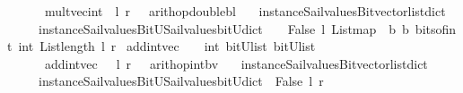 \begin{isabellebody}
\ \ \ \ \ {\isachardoublequoteopen}\ mult{\isacharunderscore}vec{\isacharunderscore}int\ \ l\ r\ {\isacharequal}\ {\isacharparenleft}\ arith{\isacharunderscore}op{\isacharunderscore}double{\isacharunderscore}bl\ \isanewline
\ \ {\isacharparenleft}instance{\isacharunderscore}Sail{}{\isacharunderscore}values{\isacharunderscore}Bitvector{\isacharunderscore}list{\isacharunderscore}dict\isanewline
\ \ \ \ \ instance{\isacharunderscore}Sail{}{\isacharunderscore}values{\isacharunderscore}BitU{\isacharunderscore}Sail{}{\isacharunderscore}values{\isacharunderscore}bitU{\isacharunderscore}dict{\isacharparenright}\ {\isacharparenleft}\ {\isacharasterisk}\ {\isacharparenright}\ False\ l\ {\isacharparenleft}List{\isachardot}map\ {\isacharparenleft}{\isasymlambda}\ b{\isachardot}\ b{\isacharparenright}\ {\isacharparenleft}bits{\isacharunderscore}of{\isacharunderscore}int\ {\isacharparenleft}int\ {\isacharparenleft}List{\isachardot}length\ l{\isacharparenright}{\isacharparenright}\ r{\isacharparenright}{\isacharparenright}{\isacharparenright}{\isachardoublequoteclose}\isanewline
\isanewline
\isanewline
%
\isanewline
%
\isanewline
%
\isanewline
{}\isamarkupfalse%
\ add{\isacharunderscore}int{\isacharunderscore}vec\ \ {\isacharcolon}{\isacharcolon}\ {\isachardoublequoteopen}\ int\ {\isasymRightarrow}{\isacharparenleft}bitU{\isacharparenright}list\ {\isasymRightarrow}{\isacharparenleft}bitU{\isacharparenright}list\ {\isachardoublequoteclose}\ \ \ \isanewline
\ \ \ \ \ {\isachardoublequoteopen}\ add{\isacharunderscore}int{\isacharunderscore}vec\ \ \ l\ r\ {\isacharequal}\ {\isacharparenleft}\ arith{\isacharunderscore}op{\isacharunderscore}int{\isacharunderscore}bv\ \isanewline
\ \ {\isacharparenleft}instance{\isacharunderscore}Sail{}{\isacharunderscore}values{\isacharunderscore}Bitvector{\isacharunderscore}list{\isacharunderscore}dict\isanewline
\ \ \ \ \ instance{\isacharunderscore}Sail{}{\isacharunderscore}values{\isacharunderscore}BitU{\isacharunderscore}Sail{}{\isacharunderscore}values{\isacharunderscore}bitU{\isacharunderscore}dict{\isacharparenright}\ {\isacharparenleft}{\isacharplus}{\isacharparenright}\ False\ l\ r\ {\isacharparenright}{\isachardoublequoteclose}\isanewline

\end{isabellebody}
